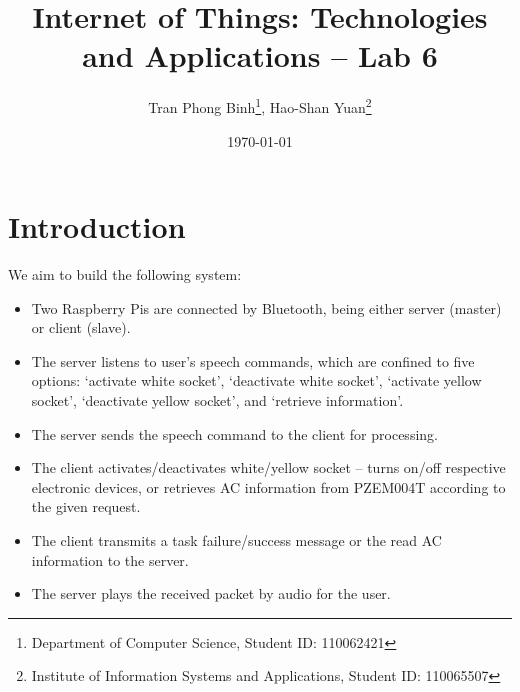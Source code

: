 \documentclass[12pt, a4paper, onside]{article}
\title{\textbf{Internet of Things: Technologies and Applications -- Lab 6}}
\author{Tran Phong Binh\thanks{Department of Computer Science, Student ID: 110062421}, Hao-Shan Yuan\thanks{Institute of Information Systems and Applications, Student ID: 110065507}}
\affil{National Tsing Hua University}
\date{\today}
\begin{document}
\maketitle

\section{Introduction}
We aim to build the following system:
\begin{itemize}
  \item Two Raspberry Pis are connected by Bluetooth, being either server (master) or client (slave).
  \item The server listens to user's speech commands, which are confined to five options: `activate white socket', `deactivate white socket', `activate yellow socket', `deactivate yellow socket', and `retrieve information'.
  \item The server sends the speech command to the client for processing.
  \item The client activates/deactivates white/yellow socket -- turns on/off respective electronic devices, or retrieves AC information from PZEM004T according to the given request.
  \item The client transmits a task failure/success message or the read AC information to the server.
  \item The server plays the received packet by audio for the user.
\end{itemize}
\end{document}
